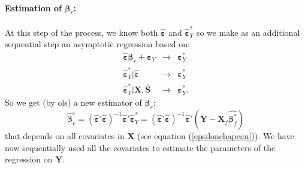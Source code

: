 \documentclass[12pt,a4paper]{report}
\begin{document}
\paragraph{Estimation of $\boldsymbol{\beta}_r$:}
At this step of the process, we know both $\hat{\boldsymbol{\varepsilon}} $ and $\hat{\boldsymbol{\varepsilon}}_Y^* $ so we make as an additional sequential step an asymptotic regression based on:
\begin{eqnarray}
	\hat{\boldsymbol{\varepsilon}} \boldsymbol{\beta}_r+\boldsymbol{\varepsilon}_Y &\longrightarrow & \boldsymbol{\varepsilon}_Y^*\\
	\hat{\boldsymbol{\varepsilon}}_Y^*|\hat{\boldsymbol{\varepsilon}} &\longrightarrow & \boldsymbol{\varepsilon}_Y^* \\
		\hat{\boldsymbol{\varepsilon}}_Y^*|\boldsymbol{X},\hat{\boldsymbol{S}} &\longrightarrow &\boldsymbol{\varepsilon}_Y^*.
\end{eqnarray}
So we get (by {\sc ols}) a new estimator of $\boldsymbol{\beta}_r$:
	\begin{equation}
		\hat{\boldsymbol{\beta}}_r^{\varepsilon}=(\hat{\boldsymbol{\varepsilon}}'\hat{\boldsymbol{\varepsilon}})^{-1}\hat{\boldsymbol{\varepsilon}}'\hat{\boldsymbol{\varepsilon}}_Y^*=(\hat{\boldsymbol{\varepsilon}}'\hat{\boldsymbol{\varepsilon}})^{-1}\hat{\boldsymbol{\varepsilon}}'(\boldsymbol{Y}- \boldsymbol{X}_f\hat{\boldsymbol{\beta}^*_f})
	\end{equation}
that depends on all covariates in $\boldsymbol{X}$ (see equation (\ref{epsilonchapeau})). We have now sequentially used all the covariates to estimate the parameters of the regression on $\boldsymbol{Y}$.
\end{document}
